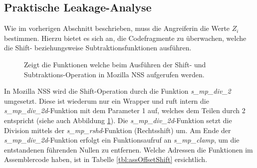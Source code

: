 \subsection{Praktische Leakage-Analyse}
\label{PracticalLeakageAnalysis}

Wie im vorherigen Abschnitt beschrieben, muss die Angreiferin die Werte $Z_i$ bestimmen.
Hierzu bietet es sich an, die Codefragmente zu überwachen, welche die Shift- beziehungsweise Subtraktionsfunktionen ausführen.

\begin{figure}[h]
\centering
\begin{scaletikzpicturetowidth}{\textwidth}
\end{scaletikzpicturetowidth}
\caption{Zeigt die Funktionen welche beim Ausführen der Shift- und Subtraktions-Operation in Mozilla NSS aufgerufen werden.}
\label{fig:GCDcallstack}
\end{figure}

In Mozilla NSS wird die Shift-Operation durch die Funktion \textit{s_mp_div_2} umgesetzt.
Diese ist wiederum nur ein Wrapper und ruft intern die \textit{s_mp_div_2d}-Funktion mit dem Parameter 1 auf, welches dem Teilen durch 2 entspricht (siehe auch Abbildung \ref{fig:GCDcallstack}).
Die \textit{s_mp_div_2d}-Funktion setzt die Division mittels der \textit{s_mp_rshd}-Funktion (Rechtsshift) um. 
Am Ende der \textit{s_mp_div_2d}-Funktion erfolgt ein Funktionsaufruf an \textit{s_mp_clamp}, um die entstandenen führenden Nullen zu entfernen.
Welche Adressen die Funktionen im Assemblercode haben, ist in Tabelle \ref{tbl:assOffsetShift} ersichtlich. 

